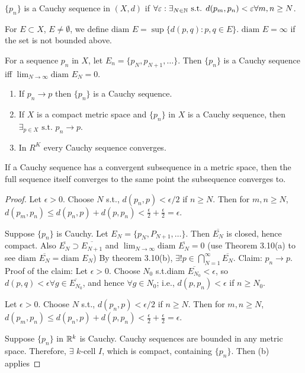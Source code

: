\begin{definition}
	$\{p_n\}$ is a Cauchy sequence in $(X,d)$ if $\forall{\varepsilon}: \exists_{N \in \mathbb{N}} \text{ s.t. } d(p_{m},p_{n})<\varepsilon \forall m,n\ge N$.
\end{definition}
\begin{definition}
	\label{def:3.9}
	For $E \subset X$, $E \neq \emptyset$, we define $\text{diam } E=\sup{\{d(p,q): p,q \in E\}}$. $\text{diam } E=\infty$ if the set is not bounded above.
	\begin{example}
		For a sequence ${p_{n}}$ in $X$, let $E_{n}=\{p_N,p_{N+1},\ldots \}$. Then $\{p_{n}\}$ is a Cauchy sequence iff $\lim_{N\to \infty }{\text{diam }E_N}=0$.
	\end{example}
\end{definition}
\begin{thm}[11]
	\begin{enumerate}
		\item \label{thm:3.11a}
		      If $p_{n}\to p$ then $\{p_{n}\} $ is a Cauchy sequence.
		\item If $X$ is a compact metric space and $\{p_{n}\}$ in $X$ is a Cauchy sequence, then $\exists_{p \in  X} \text{ s.t. } p_{n}\to p$.
		\item In $R^{K}$ every Cauchy sequence converges.
	\end{enumerate}
	\hfill
	\begin{remark}
		If a Cauchy sequence has a convergent subsequence in a metric space,
		then the full sequence itself converges to the same point the subsequence converges to.
	\end{remark}
	\begin{proof}
		\item
		Let $\epsilon>0$. Choose $N$ s.t., $d(p_{n},p)<\epsilon/2$ if $n\ge N$. Then for $m,n\ge N$, $d(p_m,p_{n})\le d(p_{n},p)+d(p,p_n)<\frac{\epsilon}{2}+\frac{\epsilon}{2}=\epsilon$.
		\item
		Suppose $\{p_n\} $ is Cauchy. Let $E_{N}=\{p_{N},P_{N+1},\ldots \} $. Then $\overline{E_{N}}$ is closed, hence compact.
		Also $\overline{E_{N}} \supset \overline{E_{N+1}}$ and $\lim_{N\to \infty }{\text{diam }\overline{E_N}}=0$ (use Theorem 3.10(a) to see $\text{diam }\overline{E_N}=\text{diam }E_N $)
		By theorem 3.10(b), $\exists! {p \in \bigcap_{N=1}^{\infty } \overline{E_N}}$. Claim: $p_{n}\to p$.\\
		Proof of the claim: Let $\epsilon>0$. Choose $N_0$ s.t.diam $\overline{E_{N_0}}<\epsilon $, so $d(p,q)<\epsilon \forall g \in \overline{E_{N_0}}$, and hence $\forall{g \in N_0}$; i.e., $d(p,p_{n})<\epsilon$ if $n\ge N_0$.

		Let $\epsilon>0$. Choose $N$ s.t., $d(p_{n},p)<\epsilon/2$ if $n\ge N$. Then for $m,n\ge N$, $d(p_m,p_{n})\le d(p_{n},p)+d(p,p_n)<\frac{\epsilon}{2}+\frac{\epsilon}{2}=\epsilon$.
		\item Suppose $\{p_{n}\} $ in $\mathbb{R}^{k}$ is Cauchy. Cauchy sequences are bounded in any metric space. Therefore, $\exists$ $k$-cell $I$, which is compact, containing $\{p_{n}\}$. Then (b) applies
	\end{proof}

\end{thm}
